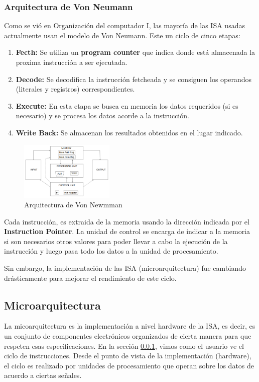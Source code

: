 \subsubsection{Arquitectura de Von Neumann}\label{sec::Intro::ISA::Von_Neuman}
Como se vió en Organización del computador I, las mayoría de las ISA usadas actualmente usan el modelo de Von Neumann. Este un ciclo de cinco etapas: 

\begin{enumerate}
	\item \textbf{Fecth:} Se utiliza un \textbf{program counter} que indica donde está almacenada la proxima instrucción a ser ejecutada.
	\item \textbf{Decode:} Se decodifica la instrucción fetcheada y se consiguen los operandos (literales y registros) correspondientes.
	\item \textbf{Execute:} En esta etapa se busca en memoria los datos requeridos (si es necesario) y se procesa los datos acorde a la instrucción.
	\item \textbf{Write Back:} Se almacenan los resultados obtenidos en el lugar indicado.
\end{enumerate}

\begin{figure}[h]
	\centering
	\includegraphics[width=0.4\textwidth]{imagenes/von_neuman_arquichtecture}
	\caption{Arquitectura de Von Newmman}
	\label{fig:intro:componentesIsa::vonsneumanarquichtecture}
\end{figure}
Cada instrucción, es extraida de la memoria usando la dirección indicada por el \textbf{Instruction Pointer}. La unidad de control se encarga de indicar a la memoria si son necesarios otros valores para poder llevar a cabo la ejecución de la instrucción y luego pasa todo los datos a la unidad de procesamiento.

Sin embargo, la implementación de las ISA (microarquitectura) fue cambiando drásticamente para mejorar el rendimiento de este ciclo.

\subsection{Microarquitectura}
La micoarquitectura es la implementación a nivel hardware de la ISA, es decir, es un conjunto de componentes electrónicos organizados de cierta manera para que respeten esas especificaciones. En la sección \ref{sec::Intro::ISA::Von_Neuman}, vimos como el usuario ve el ciclo de instrucciones. Desde el punto de vista de la implementación (hardware), el ciclo es realizado por unidades de procesamiento que operan sobre los datos de acuerdo a ciertas señales. 

